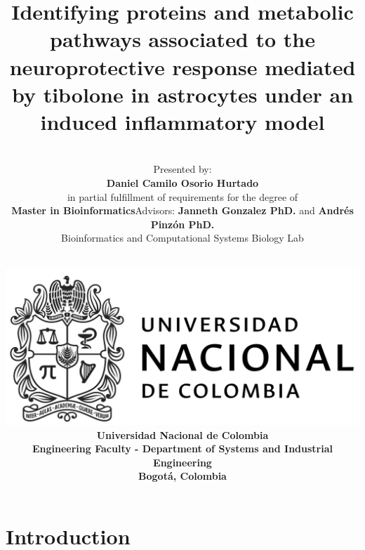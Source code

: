\documentclass[11pt]{beamer}
\author[Daniel Osorio]{\vspace*{-0.55cm}\\\normalsize{\scriptsize{Presented by:}\\\normalsize{\textbf{Daniel Camilo Osorio Hurtado}}}\\\scriptsize{in partial fulfillment of requirements for the degree of} \normalsize{\\\textbf{Master in Bioinformatics}\newline \newline Advisors: \textbf{Janneth Gonzalez PhD.} and \textbf{Andrés Pinzón PhD.}}\\\scriptsize{Bioinformatics and Computational Systems Biology Lab}}
\title[Bioinformatics Master Thesis]{Identifying proteins and metabolic pathways associated to the neuroprotective response mediated by tibolone in astrocytes under an induced inflammatory model}
\date[]{\scriptsize{\vspace{-1.1cm}\\\includegraphics[scale=.06]{UN}\\\textbf{Universidad Nacional de Colombia\\ Engineering Faculty - Department of Systems and Industrial Engineering\\Bogotá, Colombia}}}
\begin{document}
\maketitle
\section{Introduction}
\end{document}
